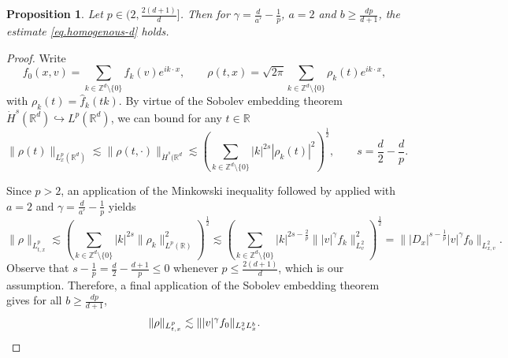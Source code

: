 \documentclass[11pt,a4paper,reqno]{amsart}
\theoremstyle{plain}
\newtheorem{proposition}[theorem]{Proposition}
\theoremstyle{remark}
\begin{document}
\begin{proposition}\label{prop.horizontal-line}
Let $p\in (2,\frac{2(d+1)}{d}]$. Then for $\gamma = \frac{d}{a'}-\frac{1}{p}$, $a=2$ and $b\geq \frac{dp}{d+1}$, the estimate \eqref{eq.homogenous-d} holds.
\end{proposition}

\begin{proof} Write 
\[
  f_0(x,v)=\sum_{k\in\mathbb{Z}^d \setminus \{0\}} f_k(v)e^{ik\cdot x}, \qquad \rho(t,x) =\sqrt{2\pi} \sum_{k\in\mathbb{Z}^d \setminus \{0\}} \rho_k(t) e^{ik\cdot x},
\]
with $\rho_k(t)=\widehat{f}_k(tk)$. By virtue of the Sobolev embedding theorem $\dot{H}^s(\mathbb{R}^d) \hookrightarrow L^p(\mathbb{R}^d)$, we can bound for any $t \in \mathbb{R}$ 
\[
    \|\rho(t)\|_{L^p_x(\mathbb{R}^d)} \lesssim \|\rho(t,\cdot)\|_{\dot{H}^s(\mathbb{R}^d} \lesssim \left( \sum_{k\in\mathbb{Z}^d \setminus \{0\}} |k|^{2s}|\rho_k(t)|^2\right)^{\frac{1}{2}}, \qquad s = \frac{d}{2} - \frac{d}{p}.
\]    

Since $p>2$, an application of the Minkowski inequality followed by  applied with $a=2$ and $\gamma=\frac{d}{a'}-\frac{
1}{p}$ yields
\[
    \|\rho\|_{L^p_{t,x}} \lesssim \left( \sum_{k\in\mathbb{Z}^d \setminus \{0\}} |k|^{2s}\|\rho_k\|_{L^p(\mathbb{R})}^2\right)^{\frac{1}{2}} \lesssim 
    \left(\sum_{k\in\mathbb{Z}^d \setminus \{0\}} |k|^{2s-\frac{2}{p}}\||v|^{\gamma}f_k\|^2_{L^2_v}\right)^{\frac{1}{2}} = \||D_x|^{s-\frac{1}{p}}|v|^{\gamma}f_0\|_{L^2_{x,v}}.
\]
Observe that $s-\frac{1}{p} = \frac{d}{2} - \frac{d+1}{p} \leq 0$ whenever $p \leq \frac{2(d+1)}{d}$, which is our assumption. Therefore, a final application of the Sobolev embedding theorem gives for all $b\geq \frac{dp}{d+1}$,
\[
    \|\rho\|_{L^p_{t,x}} \lesssim \||v|^{\gamma}f_0\|_{L^2_vL^b_x}. \qedhere
\]
\end{proof}
\end{document}
